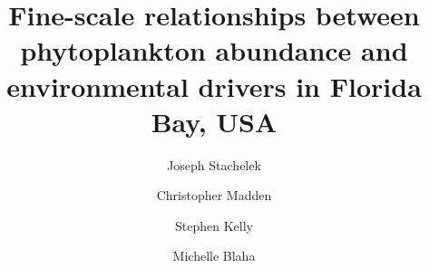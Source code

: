 %
%
%
%
%
%
\RequirePackage{fix-cm}
%
\documentclass[smallextended]{svjour3}       %
%
\smartqed  %
%
\usepackage{graphicx}
%
%
%
%
%


\title{Fine-scale relationships between phytoplankton abundance and environmental drivers in Florida Bay, USA%
}


\author{Joseph Stachelek         \and
        Christopher Madden  \and
        Stephen Kelly \and
        Michelle Blaha%
}

